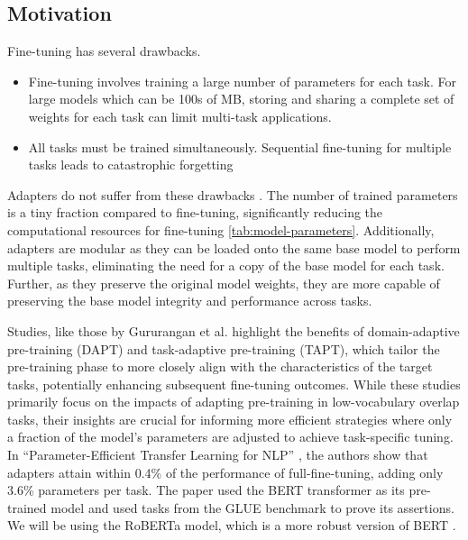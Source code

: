 \documentclass[10pt,twocolumn,letterpaper]{article}
\begin{document}
\subsection{Motivation}  Fine-tuning has several drawbacks.
\begin{itemize}
    \item Fine-tuning involves training a large number of parameters for each task. For large models which can be 100s of MB, storing and sharing a complete set of weights for each task can limit multi-task applications.
    \item All tasks must be trained simultaneously. Sequential fine-tuning for multiple tasks leads to catastrophic forgetting \cite{mccloskey1989catastrophic}
\end{itemize}
Adapters do not suffer from these drawbacks \cite{houlsby2019parameter}. The number of trained parameters is a tiny fraction compared to fine-tuning, significantly reducing the computational resources for fine-tuning \ref{tab:model-parameters}. Additionally, adapters are modular as they can be loaded onto the same base model to perform multiple tasks, eliminating the need for a copy of the base model for each task. Further, as they preserve the original model weights, they are more capable of preserving the base model integrity and performance across tasks.

Studies, like those by Gururangan et al. \cite{gururangan2020dont} highlight the benefits of domain-adaptive pre-training (DAPT) and task-adaptive pre-training (TAPT), which tailor the pre-training phase to more closely align with the characteristics of the target tasks, potentially enhancing subsequent fine-tuning outcomes. While these studies primarily focus on the impacts of adapting pre-training in low-vocabulary overlap tasks, their insights are crucial for informing more efficient strategies where only a fraction of the model’s parameters are adjusted to achieve task-specific tuning. In “Parameter-Efficient Transfer Learning for NLP” \cite{houlsby2019parameter}, the authors show that adapters attain within 0.4\% of the performance of full-fine-tuning, adding only 3.6\% parameters per task. The paper used the BERT transformer as its pre-trained model and used tasks from the GLUE benchmark to prove its assertions. We will be using the RoBERTa model, which is a more robust version of BERT \cite{liu2019roberta}.
\end{document}
